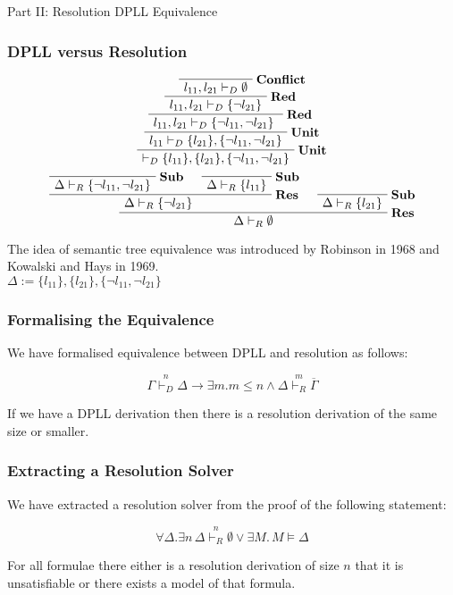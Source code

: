 \documentclass{beamer}
\newcommand{\Sub}{\mathbf{Sub}}
\newcommand{\Reso}{\mathbf{Res}}
\newcommand{\Unit}{\mathbf{Unit}}
\newcommand{\Red}{\mathbf{Red}}
\newcommand{\Conflict}{\mathbf{Conflict}}
\newcommand{\mybar}[1]{\overline{#1}}
\newcommand{\vdashnD}[1]{\overset{#1}{\vdash_{D}}}
\newcommand{\vdashnR}[1]{\overset{#1}{\vdash_{R}}}
\begin{document}
\begin{frame}
\begin{center}
{\Large Part II: Resolution DPLL Equivalence}
\end{center}

\end{frame}

\begin{frame}
\frametitle{DPLL versus Resolution}
\[
\AxiomC{$ $}
\RightLabel{$\mathrm{\Conflict}$}
\UnaryInfC{$l_{11}, l_{21} \vdash_D \emptyset$}
\RightLabel{$\mathrm{\Red}$}
\UnaryInfC{$ l_{11}, l_{21} \vdash_D  \{ \neg l_{21} \}$}
\RightLabel{$\mathrm{\Red}$}
\UnaryInfC{$ l_{11}, l_{21} \vdash_D  \{ \neg l_{11} , \neg l_{21} \}$ }
\RightLabel{$\mathrm{\Unit}$}
\UnaryInfC{$ l_{11} \vdash_D  \{l_{21} \}, \{ \neg l_{11} , \neg l_{21} \} $}
\RightLabel{$\mathrm{\Unit}$}
\UnaryInfC{$ \vdash_D \{ l_{11} \}, \{l_{21} \}, \{ \neg l_{11} , \neg l_{21} \} $}
\DisplayProof \]
\medskip
\[
\AxiomC{$ $}
\RightLabel{$\Sub$}
\UnaryInfC{$ \Delta \vdash_R \{ \neg l_{11},  \neg l_{21} \}  $}
\AxiomC{$ $}
\RightLabel{$\Sub$}
\UnaryInfC{$\Delta \vdash_R \{ l_{11} \}$}
\RightLabel{$\Reso$}
\BinaryInfC{$ \Delta \vdash_R \{ \neg l_{21} \}$ }
\RightLabel{$\Sub$}
\AxiomC{$$}
\UnaryInfC{$ \Delta \vdash_R \{  l_{21} \} $}
\RightLabel{$\Reso$}
\BinaryInfC{$ \Delta \vdash_R \emptyset $}
\DisplayProof
\]

\medskip

The idea of semantic tree equivalence was introduced by Robinson in 1968 and Kowalski and Hays in 1969.  \\
\medskip
$\Delta := \{ l_{11} \}, \{l_{21} \}, \{ \neg l_{11} , \neg l_{21} \} $

\end{frame}

\begin{frame}
\frametitle{Formalising the Equivalence}
We have formalised equivalence between DPLL and  resolution as follows:


$$\Gamma \vdashnD{n} \Delta  \to \exists m.  m \leq n \wedge\Delta \vdashnR{m} \mybar{\Gamma}$$

\bigskip

If we have a DPLL derivation then there is a resolution derivation of the same size or smaller.

\end{frame}


\begin{frame}
\frametitle{Extracting a Resolution Solver}


We have extracted a resolution solver from the proof of the following statement:

$$\forall \Delta. \exists n \, \Delta \vdashnR{n} \emptyset \vee  \exists M. \,  M \models \Delta$$

\bigskip

For all formulae there either is a resolution derivation of size $n$ that it is unsatisfiable or there exists a model of that formula.

\end{frame}
\end{document}
